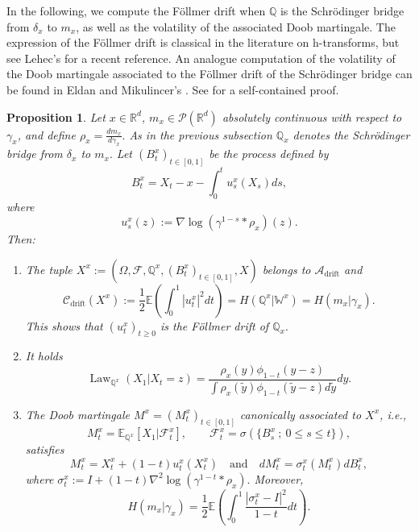 \documentclass[reqno, a4paper]{amsart}
\theoremstyle{plain}
\newtheorem{proposition}[theorem]{Proposition}
\theoremstyle{definition}
\theoremstyle{remark}
\numberwithin{equation}{section}
\numberwithin{theorem}{section}
\newcommand{\R}{\mathbb{R}}
\newcommand{\E}{\mathbb{E}}
\newcommand{\Law}{\operatorname{Law}}
\newcommand{\PP}{\mathcal{P}}
\begin{document}
	In the following, we compute the Föllmer drift when $\mathbb{Q}$ is the Schrödinger bridge from $\delta_x$ to $m_x$, as well as the volatility of the associated Doob martingale. The expression of the Föllmer drift is classical in the literature on h-transforms, but see Lehec's \cite[Theorem~12]{Le13} for a recent reference.  An analogue computation of the volatility of the Doob martingale associated to the Föllmer drift of the Schrödinger bridge can be found in Eldan and Mikulincer's \cite{ElMi20}. 	See \cite[Appendix C]{BaBeBiLe26v1} for a self-contained proof.
	\begin{proposition}\label{prop:expression_Follmer_drift}
		Let $x \in \R^d$, $m_x \in \PP(\R^d)$ absolutely continuous with respect to $\gamma_x$, and define $\rho_x = \frac{dm_x}{d \gamma_x}.$ As in the previous subsection $\mathbb Q_x$ denotes the Schrödinger bridge from $\delta_x$ to $m_x.$ Let $(B_t^x)_{t \in [0,1]}$ be the process defined by 
		\begin{equation*}\label{eq:time_changed_BM}
			B_t^x  = X_t - x - \int_0^t u_s^x(X_s)ds,
		\end{equation*}
		where $$u_s^x(z) := \nabla \log (\gamma^{1-s}*\rho_x)(z).$$ Then:
		\begin{enumerate}
			\item\label{point:expression_drift} The tuple $X^x := (\Omega, \mathcal{F}, \mathbb{Q}^x, (B_t^x)_{t \in [0,1]}, X)$ belongs to $\mathcal A_{\mathrm{drift}}$ and
			\begin{equation*}\label{eq:equality_drift}
				\mathcal{C}_{\textrm{drift}}(X^x) := \frac{1}{2}\E\left(\int_0^1 |u_t^x|^2 dt\right) = H(\mathbb{Q}^x|\mathbb{W}^x) = H(m_x|\gamma_x).
			\end{equation*}
			This shows that $(u_t^x)_{t \geq 0}$ is the Föllmer drift of $\mathbb Q_x.$
			\item\label{point:law_Follmer_drift} It holds
			$$\Law_{\mathbb{Q}^x}(X_1|X_t=z) =  \frac{ \rho_x(y) \phi_{1-t}(y-z)}{\int \rho_x(\tilde y) \phi_{1-t}(\tilde y-z)d \tilde y }dy.$$
			\item\label{point:expression_martingale} The Doob martingale $M^x =(M_t^x)_{t \in [0,1]}$ canonically associated to $X^x$, i.e., 
			$$M_t^x = \E_{\mathbb{Q}^x}[X_1|\mathcal{F}_t^x], \qquad \mathcal{F}_t^x = \sigma(\{B_s^x~;~0 \leq s \leq t\}),$$
			satisfies
			\begin{equation}\label{eq:explicit_M_via_X}
				M_t^x = X_t^x + (1-t) u_t^x(X_t^x) \quad \text{and} \quad dM_t^x = \sigma_t^x(M_t^x) d B_t^x,
			\end{equation}
			where $\sigma_t^x := I + (1-t) \nabla^2 \log (\gamma^{1-t}*\rho_x).$ Moreover,
			\begin{equation*}
				H(m_x|\gamma_x) = \frac12 \E \left( \int_0^1 \frac{|\sigma_t^x - I|^2}{1-t}dt\right).
			\end{equation*}
		\end{enumerate}
	\end{proposition}
	
\end{document}
